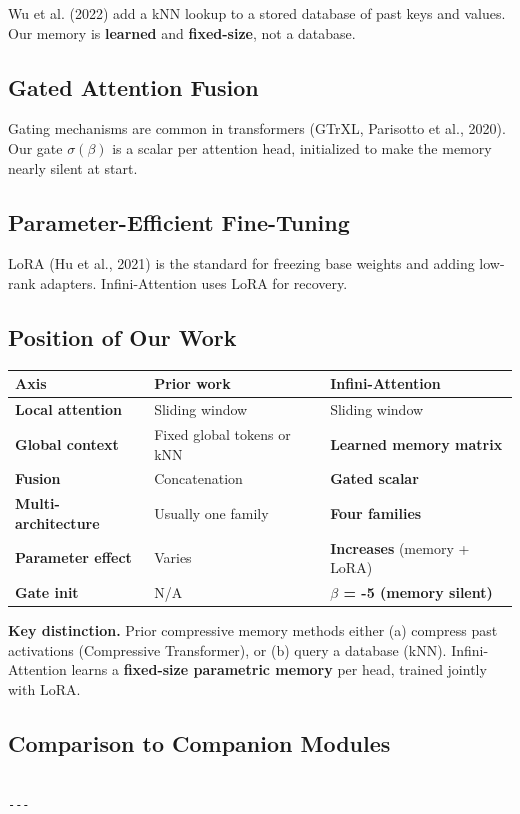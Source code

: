 Wu et al. (2022) add a kNN lookup to a stored database of past keys and 
values. Our memory is \textbf{learned} and \textbf{fixed-size}, not a database.

\subsection{Gated Attention Fusion}

Gating mechanisms are common in transformers (GTrXL, Parisotto et al., 2020). 
Our gate $\sigma(\beta)$ is a scalar per attention head, initialized to make 
the memory nearly silent at start.

\subsection{Parameter-Efficient Fine-Tuning}

LoRA (Hu et al., 2021) is the standard for freezing base weights and adding 
low-rank adapters. Infini-Attention uses LoRA for recovery.

\subsection{Position of Our Work}

\begin{table}[H]
\centering
\small
\begin{tabular}{lll}
\toprule
\textbf{Axis} & \textbf{Prior work} & \textbf{Infini-Attention} \\
\midrule
\textbf{Local attention} & Sliding window & Sliding window \\
\textbf{Global context} & Fixed global tokens or kNN & \textbf{Learned memory matrix} \\
\textbf{Fusion} & Concatenation & \textbf{Gated scalar} \\
\textbf{Multi-architecture} & Usually one family & \textbf{Four families} \\
\textbf{Parameter effect} & Varies & \textbf{Increases} (memory + LoRA) \\
\textbf{Gate init} & N/A & \textbf{$\beta$ = -5 (memory silent)} \\
\bottomrule
\end{tabular}
\end{table}

\textbf{Key distinction.} Prior compressive memory methods either (a) compress 
past activations (Compressive Transformer), or (b) query a database (kNN). 
Infini-Attention learns a \textbf{fixed-size parametric memory} per head, 
trained jointly with LoRA.

\subsection{Comparison to Companion Modules}

\begin{lstlisting}

---
\end{lstlisting}